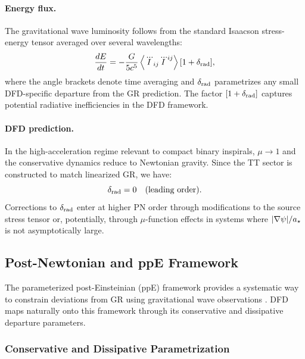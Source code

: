 \paragraph{Energy flux.}
The gravitational wave luminosity follows from the standard Isaacson stress-energy tensor averaged over several wavelengths:
\begin{equation}\label{eq:gw-flux}
\frac{dE}{dt} = -\frac{G}{5c^5}\left\langle\dddot{I}_{ij}\dddot{I}^{ij}\right\rangle[1 + \delta_{\rm rad}],
\end{equation}
where the angle brackets denote time averaging and $\delta_{\rm rad}$ parametrizes any small DFD-specific departure from the GR prediction. The factor $[1 + \delta_{\rm rad}]$ captures potential radiative inefficiencies in the DFD framework.

\paragraph{DFD prediction.}
In the high-acceleration regime relevant to compact binary inspirals, $\mu \to 1$ and the conservative dynamics reduce to Newtonian gravity. Since the TT sector is constructed to match linearized GR, we have:
\begin{equation}\label{eq:delta-rad-zero}
\delta_{\rm rad} = 0 \quad \text{(leading order)}.
\end{equation}
Corrections to $\delta_{\rm rad}$ enter at higher PN order through modifications to the source stress tensor or, potentially, through $\mu$-function effects in systems where $|\nabla\psi|/a_\star$ is not asymptotically large.

\subsection{Post-Newtonian and ppE Framework}\label{sec:gw-ppe}

The parameterized post-Einsteinian (ppE) framework provides a systematic way to constrain deviations from GR using gravitational wave observations \cite{Yunes2009}. DFD maps naturally onto this framework through its conservative and dissipative departure parameters.

\subsubsection{Conservative and Dissipative Parametrization}\label{sec:gw-ppe-param}

